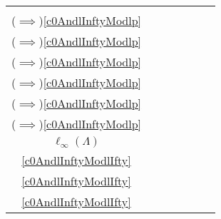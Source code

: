 \begin{scriptsize}
\begin{longtable}{|c|c|c|c|c|c|c|}
\begin{tabular}{@{}c@{}}
                $\operatorname{Card}(\Lambda)<\aleph_0$ \\
                ($\implies$){\ref{c0AndlInftyModlp}}
            \end{tabular} &
            \begin{tabular}{@{}c@{}}
                $\operatorname{Card}(\Lambda)<\aleph_0$ \\
                ($\implies$){\ref{c0AndlInftyModlp}}
            \end{tabular} &
            \begin{tabular}{@{}c@{}}
                $\operatorname{Card}(\Lambda)<\aleph_0$ \\
                ($\implies$){\ref{c0AndlInftyModlp}}
            \end{tabular} &
            \begin{tabular}{@{}c@{}}
                $\operatorname{Card}(\Lambda)<\aleph_0$ \\
                ($\implies$){\ref{c0AndlInftyModlp}}
            \end{tabular} &
            \begin{tabular}{@{}c@{}}
                $\operatorname{Card}(\Lambda)<\aleph_0$ \\
                ($\implies$){\ref{c0AndlInftyModlp}}
            \end{tabular} &
            \begin{tabular}{@{}c@{}}
                $\operatorname{Card}(\Lambda)<\aleph_0$ \\
                ($\implies$){\ref{c0AndlInftyModlp}}
            \end{tabular} \\
        \hline
            $\ell_\infty(\Lambda)$ &
            \begin{tabular}{@{}c@{}}
                $\operatorname{Card}(\Lambda)<\aleph_0$ \\
                {\ref{c0AndlInftyModlIfty}}
            \end{tabular} &
            \begin{tabular}{@{}c@{}}
                $\Lambda$ любое \\
                {\ref{c0AndlInftyModlIfty}}
            \end{tabular} &
            \begin{tabular}{@{}c@{}}
                $\operatorname{Card}(\Lambda)<\aleph_0$ \\
                {\ref{c0AndlInftyModlIfty}}
            \end{tabular} &

\end{longtable}
\end{scriptsize}
